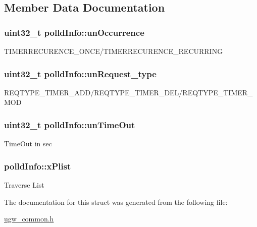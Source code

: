 \subsection{Member Data Documentation}
\hypertarget{structpolldInfo_aa560623f9e58a960842720b570f7ca78}{
\subsubsection[{un\-Occurrence}]{\setlength{\rightskip}{0pt plus 5cm}uint32\-\_\-t polld\-Info\-::un\-Occurrence}}\label{structpolldInfo_aa560623f9e58a960842720b570f7ca78}
T\-I\-M\-E\-R\-R\-E\-C\-U\-R\-E\-N\-C\-E\-\_\-\-O\-N\-C\-E/\-T\-I\-M\-E\-R\-R\-E\-C\-U\-R\-E\-N\-C\-E\-\_\-\-R\-E\-C\-U\-R\-R\-I\-N\-G \hypertarget{structpolldInfo_acf3be94a68302552eed37fe8ab74ee07}{
\subsubsection[{un\-Request\-\_\-type}]{\setlength{\rightskip}{0pt plus 5cm}uint32\-\_\-t polld\-Info\-::un\-Request\-\_\-type}}\label{structpolldInfo_acf3be94a68302552eed37fe8ab74ee07}
R\-E\-Q\-T\-Y\-P\-E\-\_\-\-T\-I\-M\-E\-R\-\_\-\-A\-D\-D/\-R\-E\-Q\-T\-Y\-P\-E\-\_\-\-T\-I\-M\-E\-R\-\_\-\-D\-E\-L/\-R\-E\-Q\-T\-Y\-P\-E\-\_\-\-T\-I\-M\-E\-R\-\_\-\-M\-O\-D \hypertarget{structpolldInfo_a0574a5c222aea42a88fea3fe8360f910}{
\subsubsection[{un\-Time\-Out}]{\setlength{\rightskip}{0pt plus 5cm}uint32\-\_\-t polld\-Info\-::un\-Time\-Out}}\label{structpolldInfo_a0574a5c222aea42a88fea3fe8360f910}
Time\-Out in sec \hypertarget{structpolldInfo_a8613886ff61c141e5d5e36b2d40f709d}{
\subsubsection[{x\-Plist}]{ polld\-Info\-::x\-Plist}}\label{structpolldInfo_a8613886ff61c141e5d5e36b2d40f709d}
Traverse List 

The documentation for this struct was generated from the following file\-:\begin{DoxyCompactItemize}
\item 
\hyperlink{ugw__common_8h}{ugw\-\_\-common.\-h}\end{DoxyCompactItemize}
